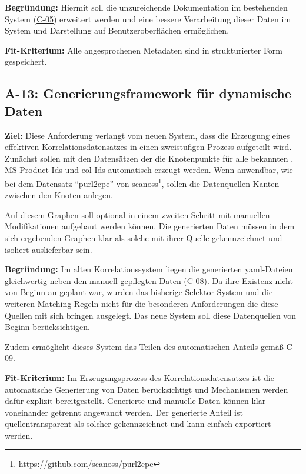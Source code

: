 \textbf{Begründung:}
Hiermit soll die unzureichende Dokumentation im bestehenden System (\hyperref[subsec:c-05-reason-not-good-enough]{C-05}) erweitert werden und eine bessere Verarbeitung dieser Daten im System und Darstellung auf Benutzeroberflächen ermöglichen.

\textbf{Fit-Kriterium:}
Alle angesprochenen Metadaten sind in strukturierter Form gespeichert.

\subsection{A-13: Generierungsframework für dynamische Daten}\label{subsec:req-generated-data}

\textbf{Ziel:}
Diese Anforderung verlangt vom neuen System, dass die Erzeugung eines effektiven Korrelationsdatensatzes in einen zweistufigen Prozess aufgeteilt wird.
Zunächst sollen mit den Datensätzen der \metaeffektsp die Knotenpunkte für alle bekannten , MS Product Ids und \acrshort{eol}-Ids automatisch erzeugt werden.
Wenn anwendbar, wie bei dem Datensatz \enquote{purl2cpe} von scanoss\footnote{\url{https://github.com/scanoss/purl2cpe}}, sollen die Datenquellen Kanten zwischen den Knoten anlegen.

Auf diesem Graphen soll optional in einem zweiten Schritt mit manuellen Modifikationen aufgebaut werden können.
Die generierten Daten müssen in dem sich ergebenden Graphen klar als solche mit ihrer Quelle gekennzeichnet und isoliert auslieferbar sein.

\textbf{Begründung:}
Im alten Korrelationssystem liegen die generierten \acrshort{yaml}-Dateien gleichwertig neben den manuell gepflegten Daten (\hyperref[subsec:c-08-generated-correlation-data]{C-08}).
Da ihre Existenz nicht von Beginn an geplant war, wurden das bisherige Selektor-System und die weiteren Matching-Regeln nicht für die besonderen Anforderungen die diese Quellen mit sich bringen ausgelegt.
Das neue System soll diese Datenquellen von Beginn berücksichtigen.

Zudem ermöglicht dieses System das Teilen des automatischen Anteils gemäß \hyperref[subsec:c-09-sharing-of-public-data]{C-09}.

\textbf{Fit-Kriterium:}
Im Erzeugungsprozess des Korrelationsdatensatzes ist die automatische Generierung von Daten berücksichtigt und Mechanismen werden dafür explizit bereitgestellt.
Generierte und manuelle Daten können klar voneinander getrennt angewandt werden.
Der generierte Anteil ist quellentransparent als solcher gekennzeichnet und kann einfach exportiert werden.

